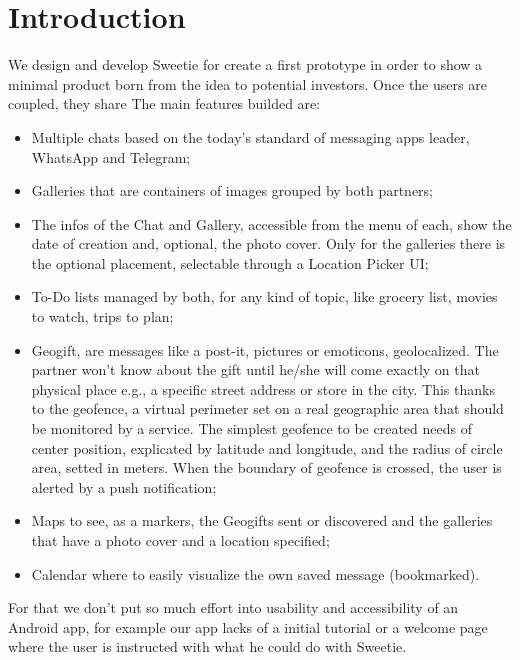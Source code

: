 
\section{Introduction}
\label{sec:introduction}


We design and develop Sweetie for create a first prototype in order to show a minimal product born from the idea to potential investors.
Once the users are coupled, they share %
The main features builded are:

\begin{itemize}
	\item Multiple chats based on the today’s standard of messaging apps leader, WhatsApp and Telegram;
	\item Galleries that are containers of images grouped by both partners;
	\item The infos of the Chat and Gallery, accessible from the menu of each, show the date of creation and, optional, the photo cover. Only for the galleries there is the optional placement, selectable through a Location Picker UI;
	\item To-Do lists managed by both, for any kind of topic, like grocery list, movies to watch, trips to plan;
	\item Geogift, are messages like a post-it, pictures or emoticons, geolocalized. The partner won’t know about the gift until he/she will come exactly on that physical place e.g., a specific street address or store in the city. This thanks to the geofence, a virtual perimeter set on a real geographic area that should be monitored by a service. The simplest geofence to be created needs of center position, explicated by latitude and longitude, and the radius of circle area, setted in meters. When the boundary of geofence is crossed, the user is alerted by a push notification;
	\item Maps to see, as a markers, the Geogifts sent or discovered and the galleries that have a photo cover and a location specified;
	\item Calendar where to easily visualize the own saved message (bookmarked).
\end{itemize}

For that we don’t put so much effort into usability and accessibility of an Android app, for example our app lacks of a initial tutorial or a welcome page where the user is instructed with what he could do with Sweetie.

